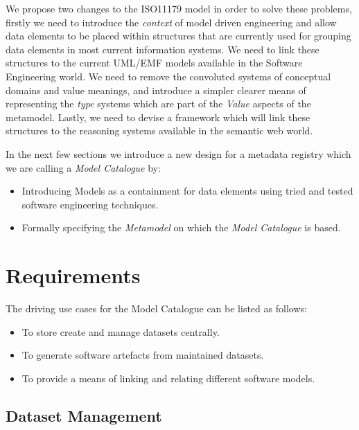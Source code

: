 \documentclass{article}
\begin{document}
We propose two changes to the ISO11179 model in order to solve these problems, firstly we need to introduce the \emph{context} of model driven engineering and allow data elements to be placed within structures that are currently used for grouping data elements in most current information systems. We need to link these structures to the current UML/EMF models available in the Software Engineering world. We need to remove the convoluted systems of conceptual domains and value meanings, and introduce a simpler clearer means of representing the \emph{type} systems which are part of the \emph{Value} aspects of the metamodel. Lastly, we need to devise a framework which will link these structures to the reasoning systems available in the semantic web world.

In the next few sections we introduce a new design for a metadata registry which we are calling a \emph{Model Catalogue} by:
\begin{itemize}
	\item Introducing Models as a containment for data elements using tried and tested software engineering techniques.
	\item Formally specifying the \emph{Metamodel} on which the \emph{Model Catalogue} is based.
\end{itemize}

 

\section{Requirements}

The driving use cases for the Model Catalogue can be listed as follows:
\begin{itemize}
\item To store create and manage datasets centrally.
\item To generate software artefacts from maintained datasets.
\item To provide a means of linking and relating different software models.
\end{itemize}

\subsection{Dataset Management}
\end{document}
